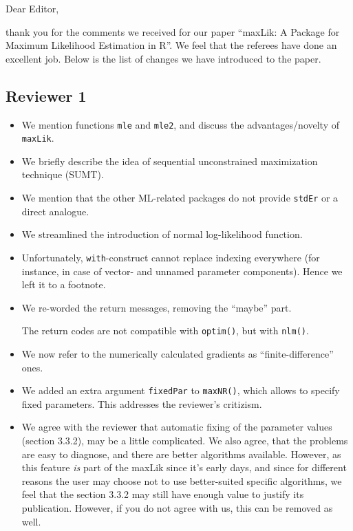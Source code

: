 \documentclass[a4paper]{article}
\begin{document}
Dear Editor,

\bigskip

thank you for the comments we received for our paper ``maxLik: A
Package for Maximum Likelihood Estimation in R''.  We feel that the
referees have done an excellent job.  Below is the list of changes we
have introduced to the paper.

\subsection*{Reviewer 1}

\begin{itemize}
\item We mention functions \texttt{mle} and \texttt{mle2}, and discuss
  the advantages/novelty of \texttt{maxLik}.
\item We briefly describe the idea of sequential unconstrained
  maximization technique (SUMT).
\item We mention that the other ML-related packages do not provide
  \texttt{stdEr} or a direct analogue.
\item We streamlined the introduction of normal log-likelihood function.
\item Unfortunately, \texttt{with}-construct cannot replace indexing
  everywhere (for instance, in case of vector- and unnamed
  parameter components).  Hence we left it to a footnote.
\item We re-worded the return messages, removing the ``maybe'' part.

  The return codes are not compatible with \texttt{optim()},
  but with \texttt{nlm()}.
\item We now refer to the numerically calculated gradients as
  ``finite-difference'' ones.
\item We added an extra argument \texttt{fixedPar} to
  \texttt{maxNR()}, which allows to specify fixed parameters.  This
  addresses the reviewer's critizism.
\item We agree with the reviewer that automatic fixing of the
  parameter values (section 3.3.2), may be a little complicated.  We
  also agree, that the problems are easy to diagnose, and there are
  better algorithms available.  However, as this feature \emph{is}
  part of the maxLik since it's early days, and since for different
  reasons
  the user may choose not to use better-suited specific algorithms, we
  feel that the section 3.3.2 may still have enough value to justify its
  publication.  However, if you do not agree with us, this can be
  removed as well.
\end{itemize}
\end{document}

